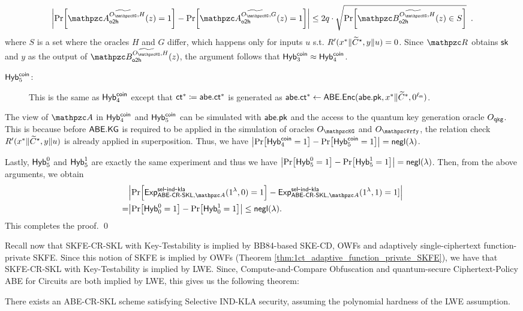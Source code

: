 \begin{align}
\abs{\Pr[\qA_\oh^{\widetilde{\Oracle{\qKG}},
H}(z)=1]-\Pr[\qA_\oh^{\widetilde{\Oracle{\qKG}}, G}(z)=1]} \leq
2q\cdot\sqrt{\Pr[\qB_\oh^{\widetilde{\Oracle{\qKG}}, H}(z)\in S]}
\enspace.
\end{align}
where $S$ is a set where
the oracles $H$ and $G$ differ, which happens only for inputs $u$ s.t.
$R'(x^*\|\widetilde{C}^\star, y\|u) = 0$. Since $\qR$ obtains $\mathsf{sk}$ and $y$ as the
output of $\qB_\oh^{\widetilde{\Oracle{\qKG}},H}(z)$, the argument
follows that $\mathsf{Hyb}_3^{\mathsf{coin}} \approx \mathsf{Hyb}_4^{\mathsf{coin}}$.

\begin{description}
\item[$\mathsf{Hyb}_{5}^{\mathsf{coin}}$:]This is the same as $\mathsf{Hyb}_{4}^{\mathsf{coin}}$ except that $\mathsf{ct}^*\coloneqq\mathsf{abe}.\mathsf{ct}^*$ is generated as $\mathsf{abe}.\mathsf{ct}^*\leftarrow\mathsf{ABE}.\mathsf{Enc}(\mathsf{abe}.\mathsf{pk},x^*\|\widetilde{C}^*,0^{\ell_{\mathsf{m}}})$.
\end{description}

The view of $\qA$ in $\mathsf{Hyb}_{4}^{\mathsf{coin}}$ and $\mathsf{Hyb}_{5}^{\mathsf{coin}}$ can be simulated with $\mathsf{abe}.\mathsf{pk}$ and the access to the quantum key generation oracle $O_{\mathtt{qkg}}$.
This is because before $\mathsf{ABE}.\mathsf{KG}$ is required to be applied in the
simulation of oracles $\Oracle{\qKG}$ and $\Oracle{\qVrfy}$, the
relation check $R'(x^* \| \widetilde{C}^\star, y\|u)$ is already applied in
superposition.
Thus, we have $\abs{\Pr[\mathsf{Hyb}_{4}^{\mathsf{coin}}=1]-\Pr[\mathsf{Hyb}_{5}^{\mathsf{coin}}=1]}={\mathsf{negl}}(\lambda)$.

Lastly, $\mathsf{Hyb}_{5}^{0}$ and $\mathsf{Hyb}_{5}^{1}$ are exactly the same experiment and thus we have $\abs{\Pr[\mathsf{Hyb}_{5}^0=1]-\Pr[\mathsf{Hyb}_{5}^1=1]}={\mathsf{negl}}(\lambda)$.
Then, from the above arguments, we obtain
\begin{align}
&\abs{\Pr[\expc{\ABESKL,\qA}{sel}{ind}{kla}(1^\secp,0)=1]-\expc{\ABESKL,\qA}{sel}{ind}{kla}(1^\secp,1)=1]}\\
=&\abs{\Pr[\hybi{0}^0=1]-\Pr[\hybi{0}^1=1]}\le\negl(\secp).
\end{align}
This completes the proof. \qed

Recall now that SKFE-CR-SKL with Key-Testability is implied by
BB84-based SKE-CD, OWFs and adaptively single-ciphertext
function-private SKFE. Since this notion of SKFE is implied by OWFs
(Theorem \ref{thm:1ct_adaptive_function_private_SKFE}), we have that
SKFE-CR-SKL with Key-Testability is implied by LWE. Since,
Compute-and-Compare Obfuscation and quantum-secure Ciphertext-Policy
ABE for Circuits are both implied by LWE, this gives us the 
following theorem:

\begin{theorem}
There exists an ABE-CR-SKL scheme satisfying Selective IND-KLA
security, assuming the polynomial hardness of the LWE assumption.
\end{theorem}


